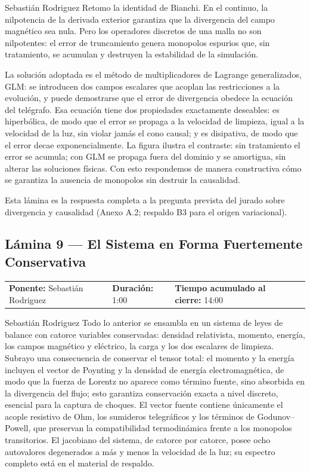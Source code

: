 \documentclass[11pt,letterpaper]{article}
\makeatletter
\newcommand{\lamina}[5]{%
  \subsection*{Lámina #1 --- #2}
  \noindent
  \begin{tabular}{@{}llll@{}}
    \textbf{Ponente:} #3 &\quad \textbf{Duración:} #4 &\quad
    \textbf{Tiempo acumulado al cierre:} #5 &
  \end{tabular}
  \vspace{2pt}}
\makeatother
\begin{document}
\begin{parlamento}{Sebastián Rodriguez}
Retomo la identidad de Bianchi. En el continuo, la nilpotencia de la derivada
exterior garantiza que la divergencia del campo magnético sea nula. Pero los
operadores discretos de una malla no son nilpotentes: el error de
truncamiento genera monopolos espurios que, sin tratamiento, se acumulan y
destruyen la estabilidad de la simulación.

La solución adoptada es el método de multiplicadores de Lagrange
generalizados, GLM: se introducen dos campos escalares que acoplan las
restricciones a la evolución, y puede demostrarse que el error de divergencia
obedece la ecuación del telégrafo. Esa ecuación tiene dos propiedades
exactamente deseables: es hiperbólica, de modo que el error se propaga a la
velocidad de limpieza, igual a la velocidad de la luz, sin violar jamás el
cono causal; y es disipativa, de modo que el error decae exponencialmente.
La figura ilustra el contraste: sin tratamiento el error se acumula; con GLM
se propaga fuera del dominio y se amortigua, sin alterar las soluciones
físicas. Con esto respondemos de manera constructiva cómo se garantiza la
ausencia de monopolos sin destruir la causalidad.
\end{parlamento}

\begin{indicaciones}
Esta lámina es la respuesta completa a la pregunta prevista del jurado sobre
divergencia y causalidad (Anexo A.2; respaldo B3 para el origen
variacional).
\end{indicaciones}

\lamina{9}{El Sistema en Forma Fuertemente Conservativa}{Sebastián Rodriguez}{1:00}{14:00}

\begin{parlamento}{Sebastián Rodriguez}
Todo lo anterior se ensambla en un sistema de leyes de balance con catorce
variables conservadas: densidad relativista, momento, energía, los campos
magnético y eléctrico, la carga y los dos escalares de limpieza. Subrayo una
consecuencia de conservar el tensor total: el momento y la energía incluyen
el vector de Poynting y la densidad de energía electromagnética, de modo que
la fuerza de Lorentz no aparece como término fuente, sino absorbida en la
divergencia del flujo; esto garantiza conservación exacta a nivel discreto,
esencial para la captura de choques. El vector fuente contiene únicamente el
acople resistivo de Ohm, los sumideros telegráficos y los términos de
Godunov--Powell, que preservan la compatibilidad termodinámica frente a los
monopolos transitorios. El jacobiano del sistema, de catorce por catorce,
posee ocho autovalores degenerados a más y menos la velocidad de la luz; su
espectro completo está en el material de respaldo.
\end{parlamento}
\end{document}
